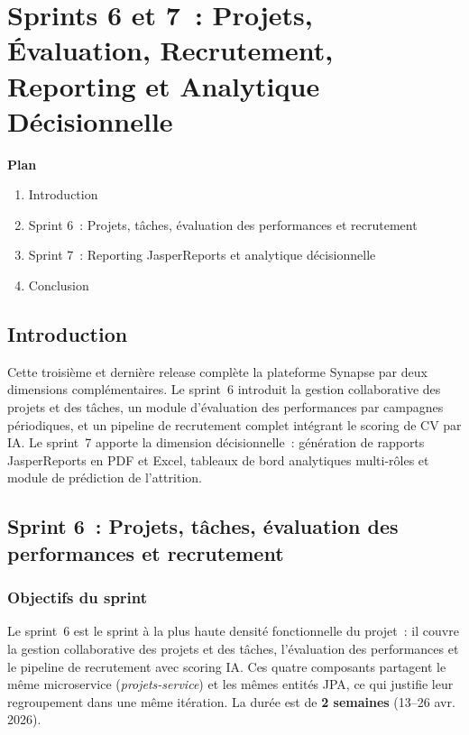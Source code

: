 ﻿%
\chapter{Sprints 6 et 7~: Projets, Évaluation, Recrutement, Reporting et Analytique Décisionnelle}

\noindent\textbf{Plan}
\begin{enumerate}
  \item Introduction
  \item Sprint 6~: Projets, tâches, évaluation des performances et recrutement
  \item Sprint 7~: Reporting JasperReports et analytique décisionnelle
  \item Conclusion
\end{enumerate}

\section{Introduction}

Cette troisième et dernière release complète la plateforme Synapse par deux
dimensions complémentaires. Le sprint~6 introduit la gestion collaborative des projets et des tâches,
un module d’évaluation des performances par campagnes périodiques, et un
pipeline de recrutement complet intégrant le scoring de CV par IA. Le sprint~7 apporte la dimension décisionnelle~:
génération de rapports JasperReports en PDF et Excel, tableaux de bord analytiques
multi-rôles et module de prédiction de l’attrition.

\section{Sprint 6~: Projets, tâches, évaluation des performances et recrutement}

\subsection{Objectifs du sprint}

Le sprint~6 est le sprint à la plus haute densité fonctionnelle du projet~: il
couvre la gestion collaborative des projets et des tâches, l’évaluation des
performances et le pipeline de recrutement avec scoring IA. Ces quatre composants
partagent le même microservice (\textit{projets-service}) et les mêmes entités JPA,
ce qui justifie leur regroupement dans une même itération. La durée est de
\textbf{2 semaines} (13--26 avr. 2026).

